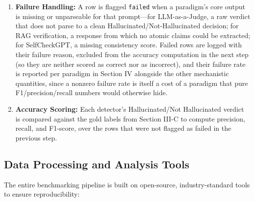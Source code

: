 \documentclass[conference]{IEEEtran}
\begin{document}
\begin{enumerate}
    \item \textbf{Failure Handling:} A row is flagged \texttt{failed} when a paradigm's core output is missing or unparseable for that prompt---for LLM-as-a-Judge, a raw verdict that does not parse to a clean Hallucinated/Not-Hallucinated decision; for RAG verification, a response from which no atomic claims could be extracted; for SelfCheckGPT, a missing consistency score. Failed rows are logged with their failure reason, excluded from the accuracy computation in the next step (so they are neither scored as correct nor as incorrect), and their failure rate is reported per paradigm in Section IV alongside the other mechanistic quantities, since a nonzero failure rate is itself a cost of a paradigm that pure F1/precision/recall numbers would otherwise hide.
    \item \textbf{Accuracy Scoring:} Each detector's Hallucinated/Not Hallucinated verdict is compared against the gold labels from Section III-C to compute precision, recall, and F1-score, over the rows that were not flagged as failed in the previous step.
\end{enumerate}

\subsection{Data Processing and Analysis Tools}

The entire benchmarking pipeline is built on open-source, industry-standard tools to ensure reproducibility:
\end{document}
